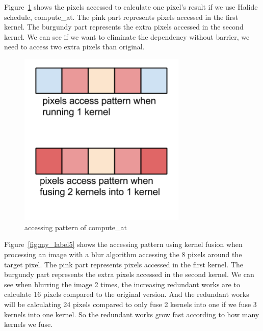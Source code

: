     Figure~\ref{fig:my_label4} shows the pixels accessed to calculate one pixel’s result if we use Halide schedule, compute\_at. The pink part represents pixels accessed in the first kernel. The burgundy part represents the extra pixels accessed in the second kernel. We can see if we want to eliminate the dependency without barrier, we need to access two extra pixels than original.
	
\begin{figure}[hbtp]
\centering
\includegraphics[width=8cm]{img/figure3.png}
\caption{accessing pattern of compute\_at}
\label{fig:my_label4}
\end{figure}
	
    Figure~\ref{fig:my_label5} shows the accessing pattern using kernel fusion when processing an image with a blur algorithm accessing the 8 pixels around the target pixel. The pink part represents pixels accessed in the first kernel. The burgundy part represents the extra pixels accessed in the second kernel. We can see when blurring the image 2 times, the increasing redundant works are to calculate 16 pixels compared to the original version. And the redundant works will be calculating 24 pixels compared to only fuse 2 kernels into one if we fuse 3 kernels into one kernel. So the redundant works grow fast according to how many kernels we fuse.

